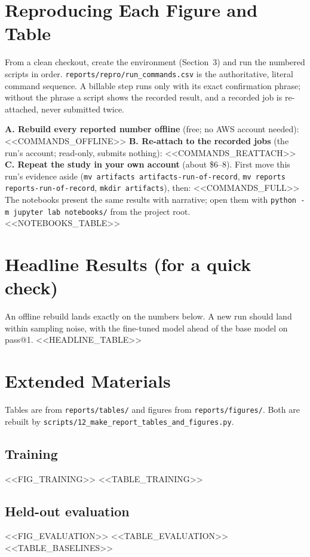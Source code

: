 \documentclass[11pt]{article}
\begin{document}
\section{Reproducing Each Figure and Table}
From a clean checkout, create the environment (Section~3) and run the numbered scripts in order.
\texttt{reports/repro/run\_commands.csv} is the authoritative, literal command sequence. A billable step runs
only with its exact confirmation phrase; without the phrase a script shows the recorded result, and a recorded
job is re-attached, never submitted twice.

\textbf{A. Rebuild every reported number offline} (free; no AWS account needed):
<<COMMANDS_OFFLINE>>
\textbf{B. Re-attach to the recorded jobs} (the run's account; read-only, submits nothing):
<<COMMANDS_REATTACH>>
\textbf{C. Repeat the study in your own account} (about \$6--8). First move this run's evidence aside
(\texttt{mv artifacts artifacts-run-of-record}, \texttt{mv reports reports-run-of-record},
\texttt{mkdir artifacts}), then:
<<COMMANDS_FULL>>
The notebooks present the same results with narrative; open them with
\texttt{python -m jupyter lab notebooks/} from the project root.
<<NOTEBOOKS_TABLE>>

\section{Headline Results (for a quick check)}
An offline rebuild lands exactly on the numbers below. A new run should land within sampling noise, with the
fine-tuned model ahead of the base model on pass@1.
<<HEADLINE_TABLE>>

\section{Extended Materials}
Tables are from \texttt{reports/tables/} and figures from \texttt{reports/figures/}. Both are rebuilt by
\texttt{scripts/12\_make\_report\_tables\_and\_figures.py}.

\subsection{Training}
<<FIG_TRAINING>>
<<TABLE_TRAINING>>

\subsection{Held-out evaluation}
<<FIG_EVALUATION>>
<<TABLE_EVALUATION>>
<<TABLE_BASELINES>>
\end{document}
